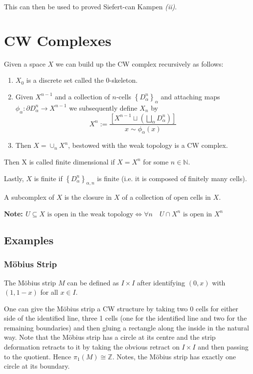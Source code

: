 \documentclass[11pt]{article}
\newcommand{\defeq}{:=}
\newcommand{\Z}{\mathbb{Z}}
\newcommand{\N}{\mathbb{N}}
\newenvironment{defin}
	{\begin{mdframed}[backgroundcolor=white, roundcorner=5pt, linewidth=1pt]
		\setlength{\parindent}{0pt}
		}
	{\end{mdframed}}
\newcommand{\mdf}[1]{{\color{red} #1}}
\newenvironment{note}
	{\begin{mdframed}[backgroundcolor=white, linecolor=red, roundcorner=5pt, linewidth=1pt]\bfseries{Note:}\normalfont}
	{\end{mdframed}}
\begin{document}
This can then be used to proved Siefert-can Kampen \textit{(ii)}.

\section{CW Complexes}
\begin{defin}
	Given a space $X$ we can build up the \mdf{CW complex} recursively as follows:
	\begin{enumerate}
		\item $X_0$ is a discrete set called the \mdf{$0$-skeleton}.
		\item Given $X^{n-1}$ and a collection of \mdf{$n$-cells} $\left\{D_\alpha^n\right\}_\alpha$ and attaching maps $\phi_\alpha:\partial D_\alpha^n\to X^{n-1}$ we subsequently define $X_n$ by
			\[
				X^n\defeq\frac{\left[X^{n-1}\sqcup\left(\bigsqcup_\alpha D_\alpha^n \right)\right]}{x\sim \phi_\alpha(x)}
			\]
		\item Then $X=\cup_n X^n$, bestowed with the \mdf{weak topology} is a \mdf{CW complex}.
	\end{enumerate}


	Then X is called \mdf{finite dimensional} if $X=X^n$ for some $n\in\N$.

	Lastly, $X$ is \mdf{finite} if $\left\{D_\alpha^n \right\}_{\alpha, n}$ is finite (i.e. it is composed of finitely many cells).

	A \mdf{subcomplex} of $X$ is the closure in $X$ of a collection of open cells in $X$.
\end{defin}
\begin{note}
		$U\subseteq X \text{ is open in the weak topology} \iff \forall n \quad U\cap X^n \text{ is open in } X^n$
\end{note}

\subsection{Examples}

\subsubsection{M\"obius Strip}
The M\"obius strip $M$ can be defined as $I\times I$ after identifying $(0, x)$ with $(1, 1-x)$ for all $x\in I$.

One can give the M\"obius strip a CW structure by taking two 0 cells for either side of the identified line, three 1 cells (one for the identified line and two for the remaining boundaries) and then gluing a rectangle along the inside in the natural way.
Note that the M\"obius strip has a circle at its centre and the strip deformation retracts to it by taking the obvious retract on $I\times I $ and then passing to the quotient.
Hence $\pi_1(M)\cong\Z$.
Notes, the M\"obius strip has exactly one circle at its boundary.
\end{document}
